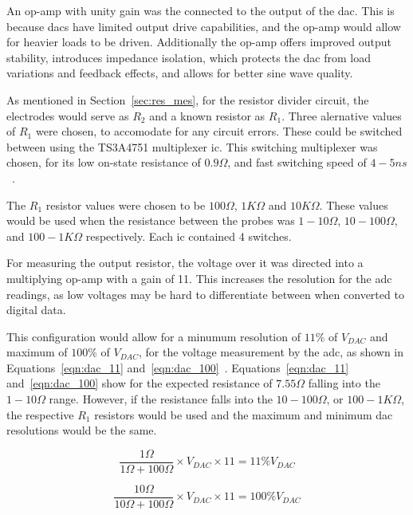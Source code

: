 An op-amp with unity gain was the connected to the output of the \gls{dac}.
This is because \gls{dac}s have limited output drive capabilities, and the op-amp would allow for heavier loads to be driven.
Additionally the op-amp offers improved output stability, introduces impedance isolation, which protects the \gls{dac} from load variations and feedback effects, and allows for better sine wave quality.

As mentioned in Section~\ref{sec:res_mes}, for the resistor divider circuit, the electrodes would serve as $R_2$ and a known resistor as $R_1$.
Three alernative values of $R_1$ were chosen, to accomodate for any circuit errors.
These could be switched between using the TS3A4751 multiplexer \gls{ic}.
This switching multiplexer was chosen, for its low on-state resistance of $0.9\Omega$, and fast switching speed of $4-5ns$~\cite{cam_clark}.

The $R_1$ resistor values were chosen to be $100\Omega$, $1K\Omega$ and $10K\Omega$.
These values would be used when the resistance between the probes was $1-10\Omega$, $10-100\Omega$, and $100-1K\Omega$ respectively.
Each \gls{ic} contained 4 switches.

For measuring the output resistor, the voltage over it was directed into a multiplying op-amp with a gain of 11.
This increases the resolution for the \gls{adc} readings, as low voltages may be hard to differentiate between when converted to digital data. 

This configuration would allow for a minumum resolution of $11\%$ of $V_{DAC}$ and maximum of $100\%$ of $V_{DAC}$, for the voltage measurement by the \gls{adc}, as shown in Equations~\ref{eqn:dac_11} and~\ref{eqn:dac_100}~\cite{cam_clark}.
Equations~\ref{eqn:dac_11} and~\ref{eqn:dac_100} show for the expected resistance of $7.55\Omega$ falling into the $1-10\Omega$ range.
However, if the resistance falls into the $10-100\Omega$, or $100-1K\Omega$, the respective $R_1$ resistors would be used and the maximum and minimum \gls{dac} resolutions would be the same.

\begin{equation}\label{eqn:dac_11}
    \frac{1\Omega}{1\Omega + 100\Omega}\times V_{DAC} \times 11 = 11\% V_{DAC}
\end{equation}

\begin{equation}\label{eqn:dac_100}
    \frac{10\Omega}{10\Omega + 100\Omega}\times V_{DAC} \times 11 = 100\% V_{DAC}
\end{equation}

